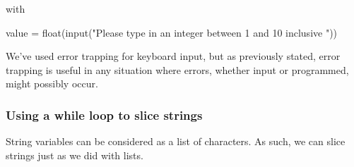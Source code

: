 \documentclass[11pt]{article}
\newenvironment{Shaded}{}{}
\newcommand{\StringTok}[1]{\textcolor[rgb]{0.25,0.44,0.63}{{#1}}}
\newcommand{\NormalTok}[1]{{#1}}
\newcommand{\OperatorTok}[1]{\textcolor[rgb]{0.40,0.40,0.40}{{#1}}}
\newcommand{\BuiltInTok}[1]{{#1}}
\begin{document}
with

\begin{Shaded}
\begin{Highlighting}[]
\NormalTok{value }\OperatorTok{=} \BuiltInTok{float}\NormalTok{(}\BuiltInTok{input}\NormalTok{(}\StringTok{"Please type in an integer between 1 and 10 inclusive "}\NormalTok{))}
\end{Highlighting}
\end{Shaded}

We've used error trapping for keyboard input, but as previously stated,
error trapping is useful in any situation where errors, whether input or
programmed, might possibly occur.

\hypertarget{using-a-while-loop-to-slice-strings}{%
\subsubsection{Using a while loop to slice
strings}\label{using-a-while-loop-to-slice-strings}}

String variables can be considered as a list of characters. As such, we
can slice strings just as we did with lists.
\end{document}
